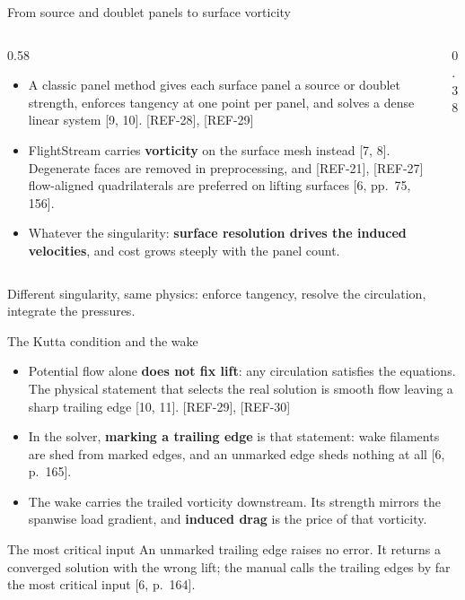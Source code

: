 \begin{frame}{From source and doublet panels to surface vorticity}
\begin{columns}[T]
\begin{column}{0.58\textwidth}
\begin{itemize}\small
  \item A classic panel method gives each surface panel a source or doublet
        strength, enforces tangency at one point per panel, and solves a
        dense linear system [9, 10]. [REF-28], [REF-29]
  \item FlightStream carries \textbf{vorticity} on the surface mesh instead
        [7, 8]. Degenerate faces are removed in preprocessing, and [REF-21], [REF-27]
        flow-aligned quadrilaterals are preferred on lifting surfaces
        [6, pp.~75, 156].
  \item Whatever the singularity: \textbf{surface resolution drives the
        induced velocities}, and cost grows steeply with the panel count.
\end{itemize}
\end{column}
\begin{column}{0.38\textwidth}
\end{column}
\end{columns}
\begin{takeaway}Different singularity, same physics: enforce tangency, resolve
the circulation, integrate the pressures.\end{takeaway}
\end{frame}

\begin{frame}{The Kutta condition and the wake}
\begin{itemize}\small
  \item Potential flow alone \textbf{does not fix lift}: any circulation
        satisfies the equations. The physical statement that selects the real
        solution is smooth flow leaving a sharp trailing edge [10, 11]. [REF-29], [REF-30]
  \item In the solver, \textbf{marking a trailing edge} is that statement:
        wake filaments are shed from marked edges, and an unmarked edge sheds
        nothing at all [6, p.~165].
  \item The wake carries the trailed vorticity downstream. Its strength
        mirrors the spanwise load gradient, and \textbf{induced drag} is the
        price of that vorticity.
\end{itemize}
\begin{alertblock}{The most critical input}
\small An unmarked trailing edge raises no error. It returns a converged
solution with the wrong lift; the manual calls the trailing edges by far the
most critical input [6, p.~164].
\end{alertblock}
\end{frame}

